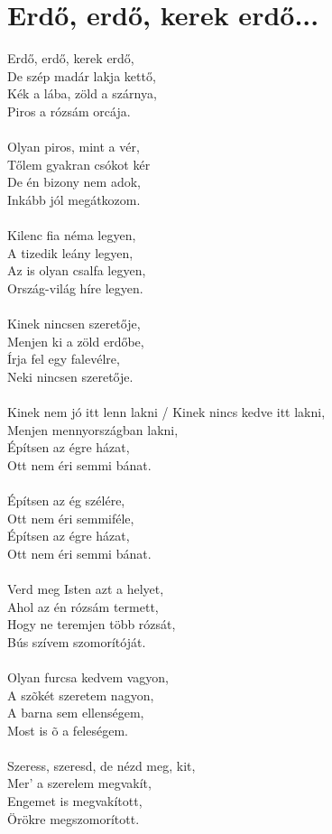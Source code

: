 \section{Erdő, erdő, kerek erdő...}
Erdő, erdő, kerek erdő,\\
De szép madár lakja kettő,\\
Kék a lába, zöld a szárnya,\\
Piros a rózsám orcája.\\\\
Olyan piros, mint a vér,\\
Tőlem gyakran csókot kér\\
De én bizony nem adok,\\
Inkább jól megátkozom.\\\\
Kilenc fia néma legyen,\\
A tizedik leány legyen,\\
Az is olyan csalfa legyen,\\
Ország-világ híre legyen.\\\\
Kinek nincsen szeretője,\\
Menjen ki a zöld erdőbe,\\
Írja fel egy falevélre,\\
Neki nincsen szeretője.\\\\
Kinek nem jó itt lenn lakni / Kinek nincs kedve itt lakni,\\
Menjen mennyországban lakni,\\
Építsen az égre házat,\\
Ott nem éri semmi bánat.\\\\
Építsen az ég szélére,\\
Ott nem éri semmiféle,\\
Építsen az égre házat,\\
Ott nem éri semmi bánat.\\\\
Verd meg Isten azt a helyet,\\
Ahol az én rózsám termett,\\
Hogy ne teremjen több rózsát,\\
Bús szívem szomorítóját.\\\\
Olyan furcsa kedvem vagyon,\\
A szõkét szeretem nagyon,\\
A barna sem ellenségem,\\
Most is õ a feleségem.\\\\
Szeress, szeresd, de nézd meg, kit,\\
Mer’ a szerelem megvakít,\\
Engemet is megvakított,\\
Örökre megszomorított.\\

